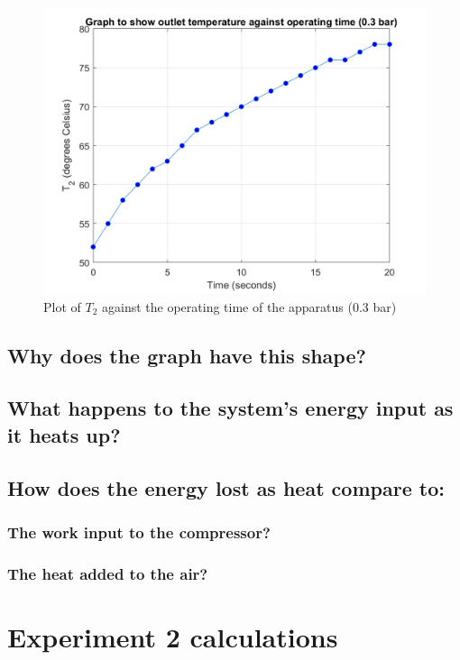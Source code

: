 \documentclass[class=article, crop=false, 12pt,a4paper]{standalone}
\numberwithin{equation}{section}
\begin{document}
\begin{figure}
  \includegraphics[width = 0.9 \textwidth]{./img/T203vsTimeGraph}
  \caption{Plot of \(T_2\) against the operating time of the apparatus (0.3 bar)}
  \label{ref:T203vsTime1bar}
\end{figure}
\subsection{Why does the graph have this shape?}
\subsection{What happens to the system's energy input as it heats up?}
\subsection{How does the energy lost as heat compare to:}
\subsubsection{The work input to the compressor?}
\subsubsection{The heat added to the air?}
\section{Experiment 2 calculations}
\end{document}
